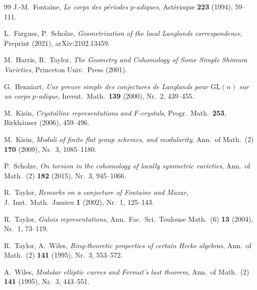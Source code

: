\documentclass[12pt,a4paper]{amsart}
\theoremstyle{definition}
\theoremstyle{remark}
\begin{document}
\begin{thebibliography}{99}
J.-M.\ Fontaine,
\textit{Le corps des périodes $p$-adiques},
Astérisque \textbf{223} (1994), 59--111.

L.\ Fargues, P.\ Scholze,
\textit{Geometrization of the local Langlands correspondence},
Preprint (2021), arXiv:2102.13459.

M.\ Harris, R.\ Taylor,
\textit{The Geometry and Cohomology of Some Simple Shimura Varieties},
Princeton Univ.\ Press (2001).

G.\ Henniart,
\textit{Une preuve simple des conjectures de Langlands pour $\mathrm{GL}(n)$ sur un corps $p$-adique},
Invent.\ Math.\ \textbf{139} (2000), Nr.\ 2, 439--455.

M.\ Kisin,
\textit{Crystalline representations and $F$-crystals},
Progr.\ Math.\ \textbf{253}, Birkhäuser (2006), 459--496.

M.\ Kisin,
\textit{Moduli of finite flat group schemes, and modularity},
Ann.\ of Math.\ (2) \textbf{170} (2009), Nr.\ 3, 1085--1180.

P.\ Scholze,
\textit{On torsion in the cohomology of locally symmetric varieties},
Ann.\ of Math.\ (2) \textbf{182} (2015), Nr.\ 3, 945--1066.

R.\ Taylor,
\textit{Remarks on a conjecture of Fontaine and Mazur},
J.\ Inst.\ Math.\ Jussieu \textbf{1} (2002), Nr.\ 1, 125--143.

R.\ Taylor,
\textit{Galois representations},
Ann.\ Fac.\ Sci.\ Toulouse Math.\ (6) \textbf{13} (2004), Nr.\ 1, 73--119.

R.\ Taylor, A.\ Wiles,
\textit{Ring-theoretic properties of certain Hecke algebras},
Ann.\ of Math.\ (2) \textbf{141} (1995), Nr.\ 3, 553--572.

A.\ Wiles,
\textit{Modular elliptic curves and Fermat's last theorem},
Ann.\ of Math.\ (2) \textbf{141} (1995), Nr.\ 3, 443--551.

\end{thebibliography}
\end{document}
